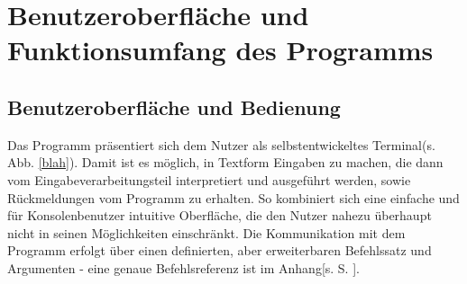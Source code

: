 \section{Benutzeroberfläche und Funktionsumfang des Programms}
\subsection{Benutzeroberfläche und Bedienung}

Das Programm präsentiert sich dem Nutzer als selbstentwickeltes Terminal(s. Abb. \ref{blah}). %
Damit ist es möglich, in Textform Eingaben zu machen, die dann vom Eingabeverarbeitungsteil interpretiert und ausgeführt werden, sowie Rückmeldungen vom Programm zu erhalten.
So kombiniert sich eine einfache und für Konsolenbenutzer intuitive Oberfläche, die den Nutzer nahezu überhaupt nicht in seinen Möglichkeiten einschränkt.
Die Kommunikation mit dem Programm erfolgt über einen definierten, aber erweiterbaren Befehlssatz und Argumenten - eine genaue Befehlsreferenz ist im Anhang[s. S. \pageref{blahkeineahnung}]. %
